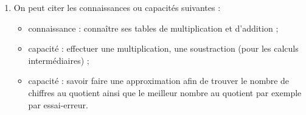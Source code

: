 \begin{enumerate}
   \item On peut citer les connaissances ou capacités suivantes :
   \begin{itemize}
      \item connaissance : connaître ses tables de multiplication et d'addition ;
      \item capacité : effectuer une multiplication, une soustraction (pour les calculs intermédiaires) ;
      \item capacité : savoir faire une approximation afin de trouver  le nombre de chiffres au quotient ainsi que le meilleur nombre au quotient par exemple par essai-erreur.
   \end{itemize}
\end{enumerate}
